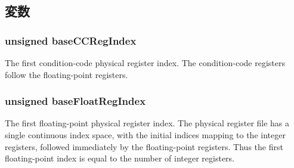 \subsection{変数}
\hypertarget{classPhysRegFile_a8c5dd07dce95e47721d3a10eb0d48865}{
\subsubsection[{baseCCRegIndex}]{\setlength{\rightskip}{0pt plus 5cm}unsigned {\bf baseCCRegIndex}}}
\label{classPhysRegFile_a8c5dd07dce95e47721d3a10eb0d48865}
The first condition-\/code physical register index. The condition-\/code registers follow the floating-\/point registers. \hypertarget{classPhysRegFile_ae54df58d8a2e2386ef1bafe11fafc0ca}{
\subsubsection[{baseFloatRegIndex}]{\setlength{\rightskip}{0pt plus 5cm}unsigned {\bf baseFloatRegIndex}}}
\label{classPhysRegFile_ae54df58d8a2e2386ef1bafe11fafc0ca}
The first floating-\/point physical register index. The physical register file has a single continuous index space, with the initial indices mapping to the integer registers, followed immediately by the floating-\/point registers. Thus the first floating-\/point index is equal to the number of integer registers.

